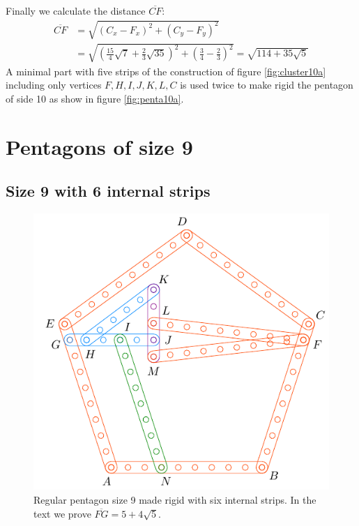 \documentclass[11pt]{article}
\begin{document}
Finally we calculate the distance $\overline{CF}$:
\begin{align}
\overline{CF} &= \sqrt{(C_x - F_x)^2 + (C_y - F_y)^2}\nonumber\\
 &= \sqrt{\left(\frac{15}{4}\sqrt7 + \frac{2}{3}\sqrt{35}\right)^2
 + \left(\frac{3}4 - \frac{2}3\right)^2} %
 = \sqrt{114+35\sqrt5}
\end{align}
A minimal part with five strips of the construction of figure \ref{fig:cluster10a} including only vertices $F,H,I,J,K,L,C$ is used twice to make rigid the pentagon of side 10 as show in figure \ref{fig:penta10a}.

\section{Pentagons of size 9}

\subsection{Size 9 with 6 internal strips}

\begin{figure}[h]
 \centering
 \includegraphics[scale=0.95]{9/penta9a}
 \caption{Regular pentagon size 9 made rigid with six internal strips. In the text we prove $\overline{FG}=5+4\sqrt5$. }
 \label{fig:penta9a}
\end{figure}
\end{document}
